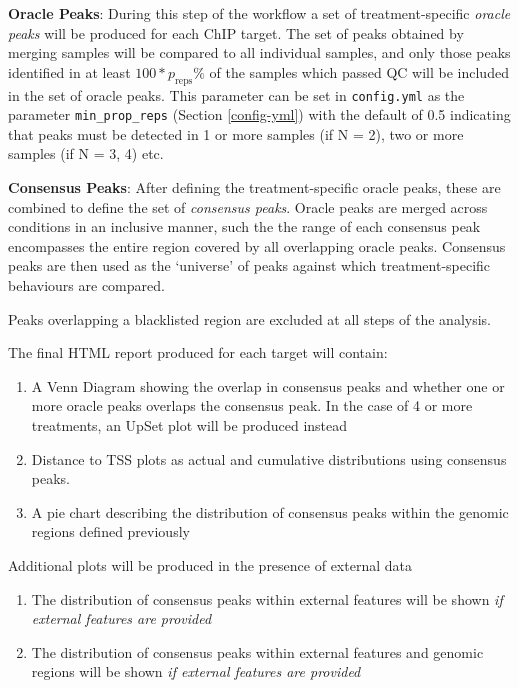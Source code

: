 \documentclass[
]{book}
\providecommand{\tightlist}{%
  \setlength{\itemsep}{0pt}\setlength{\parskip}{0pt}}
\begin{document}
\textbf{Oracle Peaks}: During this step of the workflow a set of treatment-specific \emph{oracle peaks} will be produced for each ChIP target.
The set of peaks obtained by merging samples will be compared to all individual samples, and only those peaks identified in at least \(100*p_\text{reps}\%\) of the samples which passed QC will be included in the set of oracle peaks.
This parameter can be set in \texttt{config.yml} as the parameter \texttt{min\_prop\_reps} (Section \ref{config-yml}) with the default of 0.5 indicating that peaks must be detected in 1 or more samples (if N = 2), two or more samples (if N = 3, 4) etc.

\textbf{Consensus Peaks}: After defining the treatment-specific oracle peaks, these are combined to define the set of \emph{consensus peaks}.
Oracle peaks are merged across conditions in an inclusive manner, such the the range of each consensus peak encompasses the entire region covered by all overlapping oracle peaks.
Consensus peaks are then used as the `universe' of peaks against which treatment-specific behaviours are compared.

Peaks overlapping a blacklisted region are excluded at all steps of the analysis.

The final HTML report produced for each target will contain:

\begin{enumerate}
\def\labelenumi{\arabic{enumi}.}
\tightlist
\item
  A Venn Diagram showing the overlap in consensus peaks and whether one or more oracle peaks overlaps the consensus peak. In the case of 4 or more treatments, an UpSet plot will be produced instead
\item
  Distance to TSS plots as actual and cumulative distributions using consensus peaks.
\item
  A pie chart describing the distribution of consensus peaks within the genomic regions defined previously
\end{enumerate}

Additional plots will be produced in the presence of external data

\begin{enumerate}
\def\labelenumi{\arabic{enumi}.}
\tightlist
\item
  The distribution of consensus peaks within external features will be shown \emph{if external features are provided}
\item
  The distribution of consensus peaks within external features and genomic regions will be shown \emph{if external features are provided}
\end{enumerate}
\end{document}

